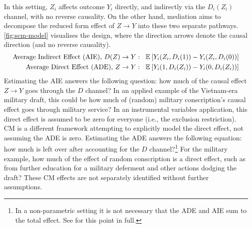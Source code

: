 In this setting, $Z_i$ affects outcome $Y_i$ directly, and indirectly via the $D_i(Z_i)$ channel, with no reverse causality.
On the other hand, mediation aims to decompose the reduced form effect of $Z \to Y$ into these two separate pathways.
\autoref{fig:scm-model} visualises the design, where the direction arrows denote the causal direction (and no reverse causality).
\begin{align*}
    \text{Average Indirect Effect (AIE), } D(Z) \to Y: \;\;\;&
        \mathbb{E}_{} \left[ Y_i(Z_i, D_i(1)) - Y_i(Z_i, D_i(0)) \right] \\
    \text{Average Direct Effect (ADE), } Z \to Y: \;\;\;&
        \mathbb{E}_{} \left[ Y_i(1, D_i(Z_i)) - Y_i(0, D_i(Z_i)) \right]
\end{align*}
Estimating the AIE answers the following question: how much of the causal effect $Z \to Y$ goes through the $D$ channel?
In an applied example of the Vietnam-era military draft, this could be how much of (random) military conscription's causal effect goes through military service?
In an instrumental variables application, this direct effect is assumed to be zero for everyone (i.e., the exclusion restriction).
CM is a different framework attempting to explicitly model the direct effect, not assuming the ADE is zero.
Estimating the ADE answers the following equation: how much is left over after accounting for the $D$ channel?\footnote{
    In a non-parametric setting it is not necessary that the ADE and AIE sum to the total effect.
    See \cite{imai2010identification} for this point in full.
}
For the military example, how much of the effect of random conscription is a direct effect, such as from further education for a military deferment and other actions dodging the draft?
These CM effects are not separately identified without further assumptions.

